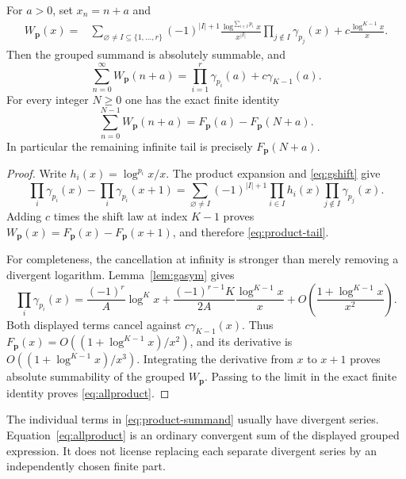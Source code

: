 \begin{theorem}
\label{thm:discrete}
For $a>0$, set $x_n=n+a$ and
\begin{align}\label{eq:product-summand}
 W_{\boldsymbol p}(x)
 ={}&\sum_{\varnothing\ne I\subseteq\{1,\ldots,r\}}
 (-1)^{|I|+1}\frac{\log^{\sum_{i\in I}p_i}x}{x^{|I|}}
             \prod_{j\notin I}\gamma_{p_j}(x)
       +c\frac{\log^{K-1}x}{x}.
\end{align}
Then the grouped summand is absolutely summable, and
\begin{equation}\label{eq:allproduct}
 \boxed{\displaystyle
 \sum_{n=0}^{\infty}W_{\boldsymbol p}(n+a)
 =\prod_{i=1}^r\gamma_{p_i}(a)+c\gamma_{K-1}(a).}
\end{equation}
For every integer $N\ge0$ one has the exact finite identity
\begin{equation}\label{eq:product-tail}
 \sum_{n=0}^{N-1}W_{\boldsymbol p}(n+a)
 =F_{\boldsymbol p}(a)-F_{\boldsymbol p}(N+a).
\end{equation}
In particular the remaining infinite tail is precisely
$F_{\boldsymbol p}(N+a)$.
\end{theorem}
\begin{proof}
Write $h_i(x)=\log^{p_i}x/x$. The product expansion and
\eqref{eq:gshift} give
\[
 \prod_i\gamma_{p_i}(x)-\prod_i\gamma_{p_i}(x+1)
 =\sum_{\varnothing\ne I}(-1)^{|I|+1}
         \prod_{i\in I}h_i(x)\prod_{j\notin I}\gamma_{p_j}(x).
\]
Adding $c$ times the shift law at index $K-1$ proves
$W_{\boldsymbol p}(x)=F_{\boldsymbol p}(x)-F_{\boldsymbol p}(x+1)$,
and therefore \eqref{eq:product-tail}.

For completeness, the cancellation at infinity is stronger than merely
removing a divergent logarithm. Lemma~\ref{lem:gasym} gives
\[
 \prod_i\gamma_{p_i}(x)
 =\frac{(-1)^r}{A}\log^Kx
  +\frac{(-1)^{r-1}K}{2A}\frac{\log^{K-1}x}{x}
  +O\left(\frac{1+\log^{K-1}x}{x^2}\right).
\]
Both displayed terms cancel against $c\gamma_{K-1}(x)$. Thus
$F_{\boldsymbol p}(x)=O((1+\log^{K-1}x)/x^2)$, and its derivative is
$O((1+\log^{K-1}x)/x^3)$. Integrating the derivative from $x$ to $x+1$
proves absolute summability of the grouped $W_{\boldsymbol p}$. Passing
to the limit in the exact finite identity proves \eqref{eq:allproduct}.
\end{proof}

\begin{remark}
The individual terms in \eqref{eq:product-summand} usually have divergent
series. Equation~\eqref{eq:allproduct} is an ordinary convergent sum of
the displayed grouped expression. It does not license replacing each
separate divergent series by an independently chosen finite part.
\end{remark}

